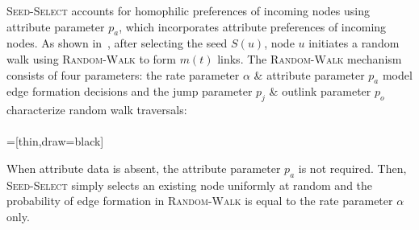 \textsc{Seed-Select} accounts for homophilic preferences of incoming nodes using
attribute parameter $p_a$, which incorporates attribute preferences of incoming nodes.
As shown in~, after selecting
the seed $S(u)$, node $u$ initiates a
random walk using \textsc{Random-Walk} to form $m(t)$ links.
The \textsc{Random-Walk} mechanism consists of four parameters: the rate parameter $\alpha$
\& attribute parameter $p_a$ model edge formation decisions and the jump parameter $p_j$ \&
outlink parameter $p_o$ characterize random walk traversals:
\\\\
=[thin,draw=black]

When attribute data is absent, the attribute parameter $p_a$ is not required.
Then, \textsc{Seed-Select} simply selects an existing node uniformly at random
and the probability of edge formation in \textsc{Random-Walk} is equal to
the rate parameter $\alpha$ only.

